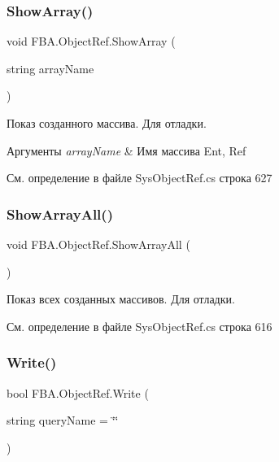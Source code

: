\subsubsection{\texorpdfstring{Show\+Array()}{ShowArray()}}
{\footnotesize\ttfamily void F\+B\+A.\+Object\+Ref.\+Show\+Array (\begin{DoxyParamCaption}\item[{string}]{array\+Name }\end{DoxyParamCaption})}



Показ созданного массива. Для отладки. 


\begin{DoxyParams}{Аргументы}
{\em array\+Name} & Имя массива Ent, Ref\\
\hline
\end{DoxyParams}


См. определение в файле Sys\+Object\+Ref.\+cs строка 627

\mbox{\label{class_f_b_a_1_1_object_ref_a6fb31073d09c76073f332b1717eaa465}} 
\subsubsection{\texorpdfstring{Show\+Array\+All()}{ShowArrayAll()}}
{\footnotesize\ttfamily void F\+B\+A.\+Object\+Ref.\+Show\+Array\+All (\begin{DoxyParamCaption}{ }\end{DoxyParamCaption})}



Показ всех созданных массивов. Для отладки. 



См. определение в файле Sys\+Object\+Ref.\+cs строка 616

\mbox{\label{class_f_b_a_1_1_object_ref_a77b0e585d76fec2ba0e0dd6bada98e4f}} 
\subsubsection{\texorpdfstring{Write()}{Write()}}
{\footnotesize\ttfamily bool F\+B\+A.\+Object\+Ref.\+Write (\begin{DoxyParamCaption}\item[{string}]{query\+Name = {\ttfamily \char`\"{}\char`\"{}} }\end{DoxyParamCaption})}



